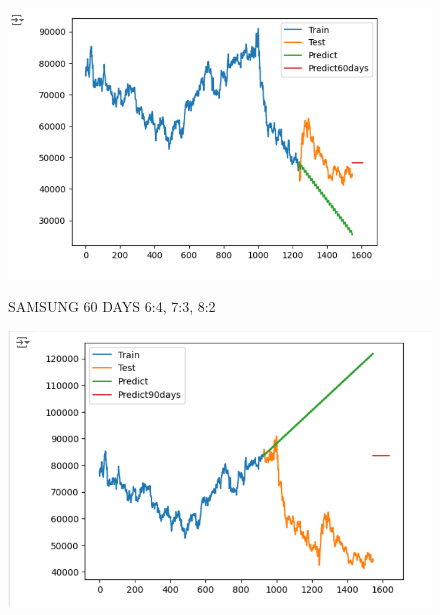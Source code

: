 \documentclass{article}
\begin{document}
\begin{multicols}{2}
\begin{figure}[H]
\begin{minipage}{0.15\textwidth}
    \label{fig:2}
    \end{minipage}%
    \begin{minipage}{0.15\textwidth}
    \centering
    \includegraphics[width=1\textwidth]{Image/ARIMA/60_8_2_SAMSUNG_Arima.png}

    \label{fig:3}
    \end{minipage}
    \caption{SAMSUNG 60 DAYS  6:4, 7:3, 8:2 }
\end{figure}

\begin{figure}[H]
    \centering
    \begin{minipage}{0.15\textwidth}
    \centering
    \includegraphics[width=1\textwidth]{Image/ARIMA/90_6_4_SAMSUNG_Arima.png}
   

\end{minipage}
\end{figure}
\end{multicols}
\end{document}
